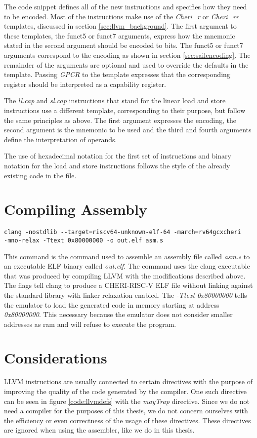The code snippet defines all of the new instructions and specifies how they need to be encoded. Most of the instructions make use of the \textit{Cheri\_r} or \textit{Cheri\_rr} templates, discussed in section \ref{sec:llvm_background}.
The first argument to these templates, the funct5 or funct7 arguments, express how the mnemonic stated in the second argument should be encoded to bits. The funct5 or funct7 arguments correspond to the encoding as shown in section \ref{sec:sailencoding}. The remainder of the arguments are optional and used to override the defaults in the template. Passing \textit{GPCR} to the template expresses that the corresponding register should be interpreted as a capability register.

The \textit{ll.cap} and \textit{sl.cap} instructions that stand for the linear load and store instructions use a different template, corresponding to their purpose, but follow the same principles as above. The first argument expresses the encoding, the second argument is the mnemonic to be used and the third and fourth arguments define the interpretation of operands.

The use of hexadecimal notation for the first set of instructions and binary notation for the load and store instructions follows the style of the already existing code in the file.

\section{Compiling Assembly}
\begin{verbatim}
clang -nostdlib --target=riscv64-unknown-elf-64 -march=rv64gcxcheri
-mno-relax -Ttext 0x80000000 -o out.elf asm.s
\end{verbatim}
This command is the command used to assemble an assembly file called \textit{asm.s} to an executable ELF binary called \textit{out.elf}. The command uses the clang executable that was produced by compiling LLVM with the modifications described above. The flags tell clang to produce a CHERI-RISC-V ELF file without linking against the standard library with linker relaxation enabled. The \textit{-Ttext 0x80000000} tells the emulator to load the generated code in memory starting at address \textit{0x80000000}. This necessary because the emulator does not consider smaller addresses as ram and will refuse to execute the program.

\section{Considerations}
LLVM instructions are usually connected to certain directives with the purpose of improving the quality of the code generated by the compiler. One such directive can be seen in figure \ref{code:llvmdefs} with the \textit{mayTrap} directive. Since we do not need a compiler for the purposes of this thesis, we do not concern ourselves with the efficiency or even correctness of the usage of these directives. These directives are ignored when using the assembler, like we do in this thesis.
